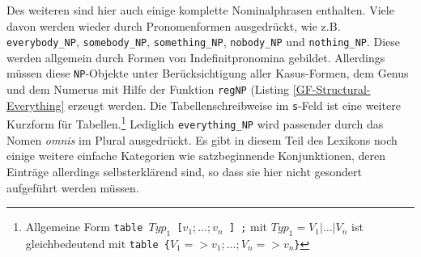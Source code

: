 Des weiteren sind hier auch einige komplette Nominalphrasen enthalten. Viele davon werden wieder durch Pronomenformen ausgedrückt, wie z.B. \texttt{everybody\_NP}, \texttt{somebody\_NP}, \texttt{something\_NP}, \texttt{nobody\_NP} und \texttt{nothing\_NP}. Diese werden allgemein durch Formen von Indefinitpronomina gebildet. Allerdings müssen diese \texttt{NP}-Objekte unter Berücksichtigung aller Kasus-Formen, dem Genus und dem Numerus mit Hilfe der Funktion \texttt{regNP} (Listing \ref{GF-Structural-Everything} erzeugt werden. Die Tabellenschreibweise im \texttt{s}-Feld ist eine weitere Kurzform für Tabellen.\footnote{Allgemeine Form \texttt{table $Typ_1$ [$v_1 ; \dots ; v_n$ ] ;} mit $Typ_1=V_1| \dots |V_n$ ist gleichbedeutend mit \texttt{table \{$V_1 => v_1 ; \dots ; V_n => v_n$\}}} Lediglich \texttt{everything\_NP} wird passender durch das Nomen \textit{omnis} im Plural ausgedrückt.
Es gibt in diesem Teil des Lexikons noch einige weitere einfache Kategorien wie satzbeginnende Konjunktionen, deren Einträge allerdings selbsterklärend sind, so dass sie hier nicht gesondert aufgeführt werden müssen.
\FloatBarrier
